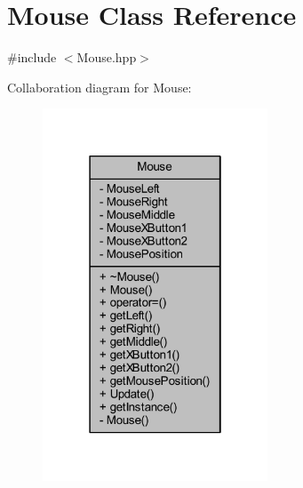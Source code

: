 \hypertarget{class_mouse}{\section{Mouse Class Reference}
\label{class_mouse}
}


{\ttfamily \#include $<$Mouse.\-hpp$>$}



Collaboration diagram for Mouse\-:\nopagebreak
\begin{figure}[H]
\begin{center}
\leavevmode
\includegraphics[width=190pt]{class_mouse__coll__graph}
\end{center}
\end{figure}
